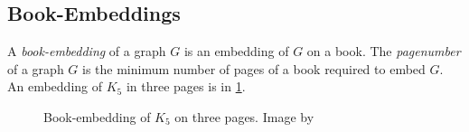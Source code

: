 \subsection{Book-Embeddings}
A \textit{book-embedding} of a graph \(G\) is an embedding of \(G\) on a book. The \textit{pagenumber} of a graph \(G\) is the minimum number of pages of a book required to embed \(G\).
An embedding of $K_5$ in three pages is in \cref{fig:book-embedding}.

\begin{figure}[h!]
	\centering
	
	\caption[Three-page book-embedding of $K_5$]{Book-embedding of $K_5$ on three pages. Image by \textcite{eppsteinBookEmbedding2014}}\label{fig:book-embedding}
\end{figure}